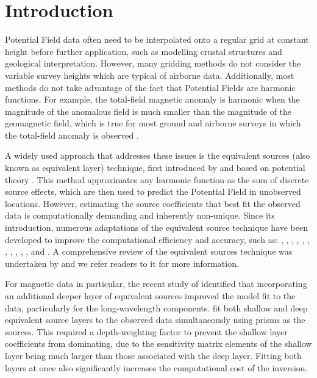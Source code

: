 \newcommand{\norm}[1]{\lVert #1 \rVert}
\newcommand{\vecbf}[1]{\vec{\mathbf{#1}}}
\newcommand{\uvec}[1]{\hat{\mathbf{#1}}}
\newcommand{\bvec}[1]{\bar{\mathbf{#1}}}
\newcommand{\mat}[1]{\bar{\bar{\mathbf{#1}}}}


\section{Introduction}

Potential Field data often need to be interpolated onto a regular grid at constant height before further application, such as modelling crustal structures and geological interpretation. However, many gridding methods do not consider the variable survey heights which are typical of airborne data. Additionally, most methods do not take advantage of the fact that Potential Fields are harmonic functions. For example, the total-field magnetic anomaly is harmonic when the magnitude of the anomalous field is much smaller than the magnitude of the geomagnetic field, which is true for most ground and airborne surveys in which the total-field anomaly is observed \citep{Blakley1995}.

A widely used approach that addresses these issues is the equivalent sources (also known as equivalent layer) technique, first introduced by \citet{Dampney1969} and based on potential theory \citep{Kellogg1967}. This method approximates any harmonic function as the sum of discrete source effects, which are then used to predict the Potential Field in unobserved locations. However, estimating the source coefficients that best fit the observed data is computationally demanding and inherently non-unique. Since its introduction, numerous adaptations of the equivalent source technique have been developed to improve the computational efficiency and accuracy, such as: \citet{Leao1989}, \citet{Cordell1992}, \citet{Mendona1994}, \citet{Guspi2009}, \citet{Li2010}, \citet{OliveiraJr2013}, \citet{Siqueira2017}, \citet{Jirigalatu2019}, \citet{Mendona2020}, \citet{Li2020}, \citet{Soler2021}, \citet{Takahashi2022} and \citet{Piauilino2024}. A comprehensive review of the equivalent sources technique was undertaken by \citet{OliveiraJr2023} and we refer readers to it for more information.

For magnetic data in particular, the recent study of \citet{Li2020} identified that incorporating an additional deeper layer of equivalent sources improved the model fit to the data, particularly for the long-wavelength components. \citet{Li2020} fit both shallow and deep equivalent source layers to the observed data simultaneously using prisms as the sources. This required a depth-weighting factor to prevent the shallow layer coefficients from dominating, due to the sensitivity matrix elements of the shallow layer being much larger than those associated with the deep layer. Fitting both layers at once also significantly increases the computational cost of the inversion.

